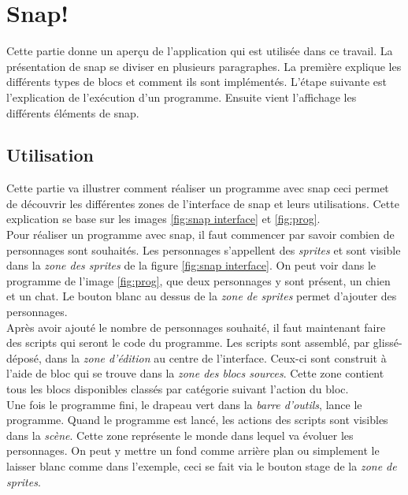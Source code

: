\section{Snap!}
Cette partie donne un aperçu de l'application qui est utilisée dans ce travail. La présentation de \gls{snap} \cite{snap} se diviser en plusieurs paragraphes. La première explique les différents types de \glspl{bloc} et comment ils sont implémentés. L'étape suivante est l'explication de l'exécution d'un programme. Ensuite vient l'affichage les différents éléments de \gls{snap}.

\subsection{Utilisation}
Cette partie va illustrer comment réaliser un programme avec \gls{snap} ceci permet de découvrir les différentes zones de l'interface de \gls{snap} et leurs utilisations. Cette explication se base sur les images \ref{fig:snap interface} et \ref{fig:prog}.\\

Pour réaliser un programme avec \gls{snap}, il faut commencer par savoir combien de personnages sont souhaités. Les personnages s'appellent des \textit{\glspl{sprite}} et sont visible dans la \textit{zone des \glspl{sprite}} de la figure \ref{fig:snap interface}. On peut voir dans le programme de l'image \ref{fig:prog}, que deux personnages y sont présent, un chien et un chat. Le bouton blanc au dessus de la \textit{zone de \glspl{sprite}} permet d'ajouter des personnages.\\

Après avoir ajouté le nombre de personnages souhaité, il faut maintenant faire des \glspl{script} qui seront le code du programme. Les \glspl{script} sont assemblé, par glissé-déposé, dans la \textit{zone d'édition} au centre de l'interface. Ceux-ci sont construit à l'aide de \gls{bloc} qui se trouve dans la \textit{zone des \glspl{bloc} sources}. Cette zone contient tous les \glspl{bloc} disponibles classés par catégorie suivant l'action du \gls{bloc}.\\

Une fois le programme fini, le drapeau vert dans la \textit{barre d'outils}, lance le programme. Quand le programme est lancé, les actions des \glspl{script} sont visibles dans la \textit{scène}. Cette zone représente le monde dans lequel va évoluer les personnages. On peut y mettre un fond comme arrière plan ou simplement le laisser blanc comme dans l'exemple, ceci se fait via le bouton stage de la \textit{zone de \glspl{sprite}}.
